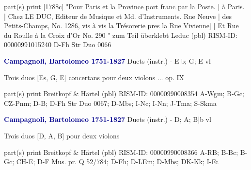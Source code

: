 \documentclass[twocolumn]{book}
\begin{document}
\newline \textcolor{darkblue}{}  part(s)
\newline print  [1788c]
\newline "Pour Paris et la Province port franc par la Poste. | à Paris. | Chez LE DUC, Editeur de Musique et Md. d'Instruments. Rue Neuve | des Petits-Champs, No. 1286, vis à vis la Trésorerie pres la Rue Vivienne] | Et Rue du Roulle à la Croix d'Or No. 290 " zum Teil überklebt
\newline Leduc  (pbl)
\newline RISM-ID: 00000991015240
\newline D-Fh  Str Duo 0066
\newline \par \vspace{7pt} \textcolor{darkblue}{\textbf{Campagnoli, Bartolomeo  1751-1827}}
\newline Duets (instr.) - E|b; G; E
 vl
\newline \begin{itshape}Trois duos [Es, G, E] concertans pour deux violons ... op. IX\end{itshape} 
\newline \textcolor{darkblue}{}  part(s)
\newline print
\newline Breitkopf \& Härtel  (pbl)
\newline RISM-ID: 00000990008354
\newline A-Wgm; B-Gc; CZ-Pnm; D-B; D-Fh  Str Duo 0067; D-Mbs; I-Nc; I-Nn; J-Tma; S-Skma
\newline \par \vspace{7pt} \textcolor{darkblue}{\textbf{Campagnoli, Bartolomeo  1751-1827}}
\newline Duets (instr.) - D; A; B|b
 vl
\newline \begin{itshape}Trois duos [D, A, B] pour deux violons\end{itshape} 
\newline \textcolor{darkblue}{}  part(s)
\newline print
\newline Breitkopf \& Härtel  (pbl)
\newline RISM-ID: 00000990008366
\newline A-RB; B-Bc; B-Gc; CH-E; D-F  Mus. pr. Q 52/784; D-Fh; D-LEm; D-Mbs; DK-Kk; I-Fc
\end{document}
